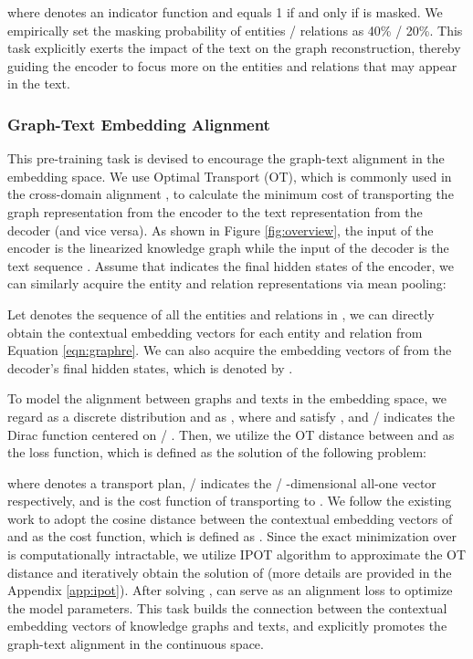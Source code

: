 \documentclass[11pt,a4paper]{article}
\begin{document}
where  denotes an indicator function and equals 1 if and only if  is masked. We empirically set the masking probability of entities / relations as 40\% / 20\%. This task explicitly exerts the impact of the text on the graph reconstruction, thereby guiding the encoder to focus more on the entities and relations that may appear in the text. 

\subsubsection{Graph-Text Embedding Alignment}



This pre-training task is devised to encourage the graph-text alignment in the embedding space. We use Optimal Transport (OT), which is commonly used in the cross-domain alignment \cite{chen2020got}, to calculate the minimum cost of transporting the graph representation from the encoder to the text representation from the decoder (and vice versa). As shown in Figure \ref{fig:overview}, the input of the encoder is the linearized knowledge graph  while the input of the decoder is the text sequence .
Assume that  indicates the final hidden states of the encoder, we can similarly acquire the entity and relation representations via mean pooling:

Let  denotes the sequence of all the entities and relations in ,
we can directly obtain the contextual embedding vectors  for each entity and relation
from Equation \ref{eqn:graphre}.
We can also acquire the embedding vectors of  from the decoder's final hidden states, which is denoted by .


To model the alignment between graphs and texts in the embedding space, we regard  as a discrete distribution  and  as ,
where  and  satisfy , and  /  indicates the Dirac function centered on  / . Then, we utilize the OT distance between  and  as the loss function, which is defined as the solution of the following problem:

where  denotes a transport plan,  /  indicates the  /  -dimensional all-one vector respectively, and  is the cost function of transporting  to . We follow the existing work \cite{chen2020uniter} to adopt the cosine distance between the contextual embedding vectors of  and  as the cost function, which is defined as .
Since the exact minimization over  is computationally intractable, we utilize IPOT algorithm \cite{xie2019ipot} to approximate the OT distance and iteratively obtain the solution of  (more details are provided in the Appendix \ref{app:ipot}). After solving ,  can serve as an alignment loss to optimize the model parameters. This task builds the connection between the contextual embedding vectors of knowledge graphs and texts, and explicitly promotes the graph-text alignment in the continuous space.
\end{document}
